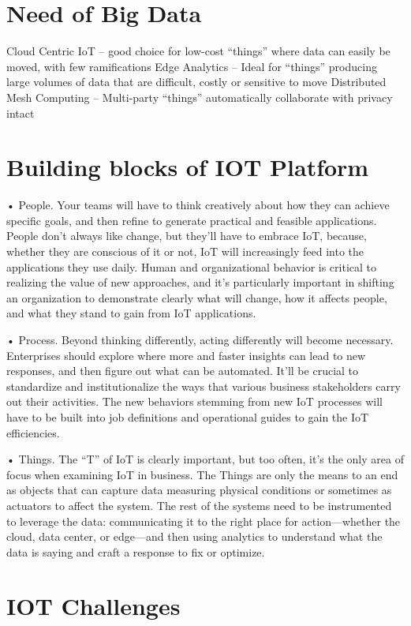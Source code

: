 \documentclass[sigconf]{acmart}
\begin{document}
\section{Need of Big Data}

Cloud Centric IoT – good choice for low-cost “things” where data can easily be moved, with few ramifications
Edge Analytics – Ideal for “things” producing large volumes of data that are difficult, costly or sensitive to move
Distributed Mesh Computing – Multi-party “things” automatically collaborate with privacy intact


\section{Building blocks of IOT Platform}

•	People. Your teams will have to think creatively about how they can achieve specific goals, and then refine to generate practical and feasible applications. People don’t always like change, but they’ll have to embrace IoT, because, whether they are conscious of it or not, IoT will increasingly feed into the applications they use daily. Human and organizational behavior is critical to realizing the value of new approaches, and it’s particularly important in shifting an organization to demonstrate clearly what will change, how it affects people, and what they stand to gain from IoT applications. 

•	Process. Beyond thinking differently, acting differently will become necessary. Enterprises should explore where more and faster insights can lead to new responses, and then figure out what can be automated. It’ll be crucial to standardize and institutionalize the ways that various business stakeholders carry out their activities. The new behaviors stemming from new IoT processes will have to be built into job definitions and operational guides to gain the IoT efficiencies. 

•	Things. The “T” of IoT is clearly important, but too often, it’s the only area of focus when examining IoT in business. The Things are only the means to an end as objects that can capture data measuring physical conditions or sometimes as actuators to affect the system. The rest of the systems need to be instrumented to leverage the data: communicating it to the right place for action—whether the cloud, data center, or edge—and then using analytics to understand what the data is saying and craft a response to fix or optimize.


\section{IOT Challenges}
\end{document}
